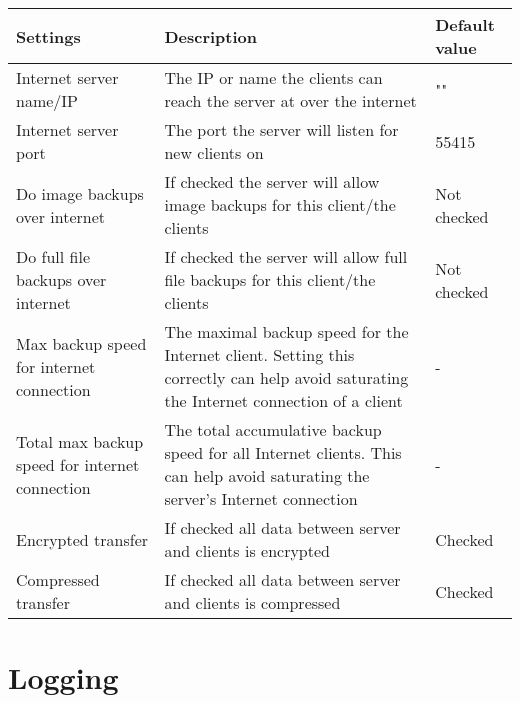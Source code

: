 \documentclass[a4paper,10pt]{article} \usepackage[breaklinks=true]{hyperref}
\begin{document}
\begin{tabular}{|p{}|p{}|p{}|}
\hline
Settings  & Description & Default value\\
\hline\hline
Internet server name/IP & The IP or name the clients can reach the server at over the internet & ""\\
\hline
Internet server port & The port the server will listen for new clients on & 55415 \\
\hline
Do image backups over internet & If checked the server will allow image backups for this client/the clients & Not checked \\
\hline
Do full file backups over internet & If checked the server will allow full file backups for this client/the clients & Not checked \\
\hline
Max backup speed for internet connection & The maximal backup speed for the Internet client. Setting this correctly can help avoid saturating the Internet connection of a client & - \\
\hline
Total max backup speed for internet connection & The total accumulative backup speed for all Internet clients. This can help avoid saturating the server's Internet connection & - \\
\hline
Encrypted transfer & If checked all data between server and clients is encrypted & Checked \\
\hline
Compressed transfer & If checked all data between server and clients is compressed & Checked \\
\hline
\end{tabular}

\section{Logging}
\label{sec:logging}
\end{document}
